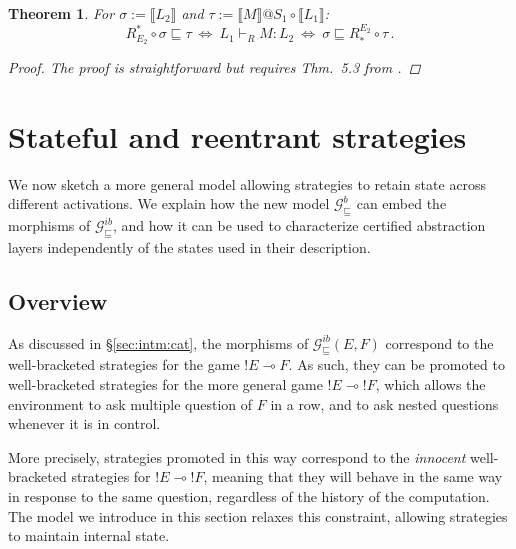 \documentclass[draft,11pt]{report}
\newtheorem{theorem}{Theorem}[chapter]
\newtheorem{lemma}[theorem]{Lemma}
\theoremstyle{definition}
\newcommand{\gcat}{\mathcal{G}_{\sqsubseteq}}
\begin{document}

\begin{theorem}
For
$\sigma := \llbracket L_2 \rrbracket$ and
$\tau := \llbracket M \rrbracket @ S_1 \circ \llbracket L_1 \rrbracket$:
\[
  R^*_{E_2} \!\circ \sigma \sqsubseteq \tau
  \: \Leftrightarrow \:
  L_1 \vdash_R M : L_2
  \: \Leftrightarrow \:
  \sigma \sqsubseteq R_*^{E_2} \!\circ \tau \,.
\]
\begin{proof}
The proof is straightforward but requires
Thm.~5.3 from \citet{dndf}.
\end{proof}
\end{theorem}




\chapter{Stateful and reentrant strategies} \label{sec:gamesem} %

We now sketch a more general model
allowing strategies to retain state
across different activations.
We explain how the new model $\gcat^b$ can embed
the morphisms of $\gcat^{ib}$,
and how it can be used to characterize
certified abstraction layers
independently of the states used in their description.

\section{Overview} %
\label{sec:arrow}

As discussed in \S\ref{sec:intm:cat},
the morphisms of $\gcat^{ib}(E, F)$
correspond to the well-bracketed strategies
for the game ${!E} \multimap F$.
As such, they can be promoted to well-bracketed strategies for
the more general game ${!E} \multimap {!F}$,
which allows the environment to ask
multiple question of $F$ in a row,
and to ask nested questions
whenever it is in control.

More precisely,
strategies promoted in this way
correspond to the \emph{innocent} well-bracketed strategies for
${!E} \multimap {!F}$,
meaning that they will behave in the same way
in response to the same question,
regardless of the history of the computation.
The model we introduce in this section
relaxes this constraint,
allowing strategies to maintain internal state.
\end{document}
